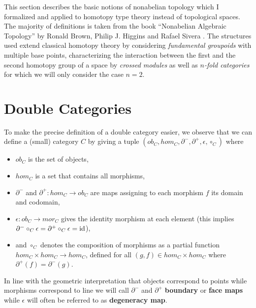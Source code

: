 This section describes the basic notions of nonabelian topology which I
formalized and applied to homotopy type theory instead of topological
spaces. The majority of definitions is taken from the book ``Nonabelian
Algebraic Topology'' by Ronald Brown, Philip J. Higgins and Rafael Sivera
\cite{nat}.
The structures used extend classical homotopy theory by considering
\emph{fundamental groupoids} with multiple base points, characterizing the 
interaction between the first and the second homotopy group of a space by 
\emph{crossed modules} as well as \emph{$n$-fold categories} for which we will
only consider the case $n = 2$.

\section{Double Categories}


To make the precise definition of a double category easier, we observe that we
can define a (small) category $C$ by giving a tuple $(ob_C, hom_C, \partial^-,
\partial^+, \epsilon, \circ_C)$ where
\begin{itemize}
\item $ob_C$ is the set of objects,
\item $hom_C$ is a set that contains all morphisms,
\item $\partial^-$ and $\partial^+ : hom_C \to ob_C$
are maps assigning to each morphism $f$ its domain and codomain,
\item $\epsilon : ob_C \to mor_C$ gives the identity morphism at each element
(this implies $\partial^- \circ_C \epsilon = \partial^+ \circ_C \epsilon = \operatorname{id}$),
\item and $\circ_C$
denotes the composition of morphisms as a partial function $hom_C \times hom_C
\to hom_C$, defined for all $(g, f) \in hom_C \times hom_C$ where
$\partial^+(f) = \partial^-(g)$.
\end{itemize}
In line with the geometric interpretation that objects correspond to points while
morphisms correspond to line we will call $\partial^-$ and $\partial^+$
\textbf{boundary} or \textbf{face maps} while $\epsilon$ will often be referred
to as \textbf{degeneracy map}.

